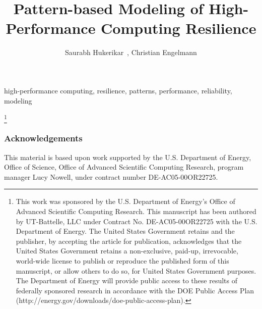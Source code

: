 \documentclass{llncs}
\newcommand\DOECopyrightFootnote[1]
{
 \begingroup
 \renewcommand\thefootnote{}\footnote{#1}%
 \addtocounter{footnote}{-1}%
 \endgroup
}
\begin{document}
\title{Pattern-based Modeling of High-Performance Computing Resilience}

\author{
        Saurabh Hukerikar~\Envelope, 
	Christian Engelmann
}

\maketitle

\begin{abstract}

\end{abstract}

\begin{keywords} high-performance computing, resilience, patterns, performance, reliability, modeling \end{keywords}
\DOECopyrightFootnote{This work was sponsored by the U.S. Department of Energy's Office of Advanced Scientific Computing Research. This manuscript has been authored by UT-Battelle, LLC under Contract No. DE-AC05-00OR22725 with the U.S. Department of Energy. The United States Government retains and the publisher, by accepting the article for publication, acknowledges that the United States Government retains a non-exclusive, paid-up, irrevocable, world-wide license to publish or reproduce the published form of this manuscript, or allow others to do so, for United States Government purposes. The Department of Energy will provide public access to these results of federally sponsored research in accordance with the DOE Public Access Plan (http://energy.gov/downloads/doe-public-access-plan).}








\subsubsection*{Acknowledgements}
This material is based upon work supported by the U.S. Department of Energy, Office of Science, Office of Advanced Scientific Computing Research, program manager Lucy Nowell, under contract number DE-AC05-00OR22725. 



\end{document}

